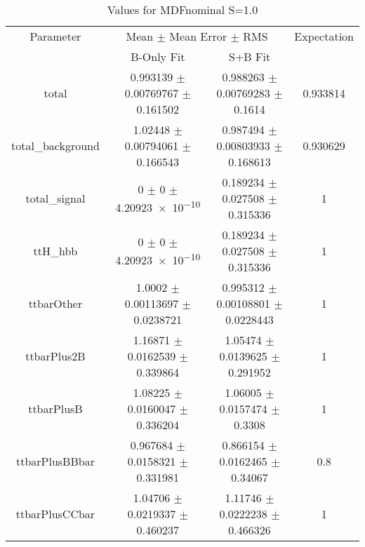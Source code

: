 \begin{table}
\centering
\caption{Values for MDFnominal S=1.0}
\begin{tabular}{cccc}
\toprule
Parameter & \multicolumn{2}{c}{Mean $\pm$ Mean Error $\pm$ RMS} & Expectation\\
 & B-Only Fit & S+B Fit & \\
\midrule
total & \num{0.993139} $\pm$ \num{0.00769767} $\pm$ \num{0.161502} & \num{0.988263} $\pm$ \num{0.00769283} $\pm$ \num{0.1614} & \num{0.933814}\\
total\_background & \num{1.02448} $\pm$ \num{0.00794061} $\pm$ \num{0.166543} & \num{0.987494} $\pm$ \num{0.00803933} $\pm$ \num{0.168613} & \num{0.930629}\\
total\_signal & \num{0} $\pm$ \num{0} $\pm$ \num{4.20923e-10} & \num{0.189234} $\pm$ \num{0.027508} $\pm$ \num{0.315336} & \num{1}\\
ttH\_hbb & \num{0} $\pm$ \num{0} $\pm$ \num{4.20923e-10} & \num{0.189234} $\pm$ \num{0.027508} $\pm$ \num{0.315336} & \num{1}\\
ttbarOther & \num{1.0002} $\pm$ \num{0.00113697} $\pm$ \num{0.0238721} & \num{0.995312} $\pm$ \num{0.00108801} $\pm$ \num{0.0228443} & \num{1}\\
ttbarPlus2B & \num{1.16871} $\pm$ \num{0.0162539} $\pm$ \num{0.339864} & \num{1.05474} $\pm$ \num{0.0139625} $\pm$ \num{0.291952} & \num{1}\\
ttbarPlusB & \num{1.08225} $\pm$ \num{0.0160047} $\pm$ \num{0.336204} & \num{1.06005} $\pm$ \num{0.0157474} $\pm$ \num{0.3308} & \num{1}\\
ttbarPlusBBbar & \num{0.967684} $\pm$ \num{0.0158321} $\pm$ \num{0.331981} & \num{0.866154} $\pm$ \num{0.0162465} $\pm$ \num{0.34067} & \num{0.8}\\
ttbarPlusCCbar & \num{1.04706} $\pm$ \num{0.0219337} $\pm$ \num{0.460237} & \num{1.11746} $\pm$ \num{0.0222238} $\pm$ \num{0.466326} & \num{1}\\
\bottomrule
\end{tabular}
\end{table}